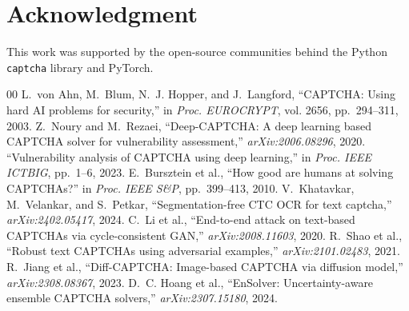 ﻿\documentclass[conference]{IEEEtran}
\begin{document}
\section*{Acknowledgment}
This work was supported by the open-source communities behind the Python \texttt{captcha} library and PyTorch.

\begin{thebibliography}{00}
 L.~von Ahn, M.~Blum, N.~J. Hopper, and J.~Langford, ``CAPTCHA: Using hard AI problems for security,'' in \textit{Proc. EUROCRYPT}, vol. 2656, pp.~294--311, 2003.
 Z.~Noury and M.~Rezaei, ``Deep-CAPTCHA: A deep learning based CAPTCHA solver for vulnerability assessment,'' \textit{arXiv:2006.08296}, 2020.
 ``Vulnerability analysis of CAPTCHA using deep learning,'' in \textit{Proc. IEEE ICTBIG}, pp.~1--6, 2023.
 E.~Bursztein et al., ``How good are humans at solving CAPTCHAs?'' in \textit{Proc. IEEE S\&P}, pp.~399--413, 2010.
 V.~Khatavkar, M.~Velankar, and S.~Petkar, ``Segmentation-free CTC OCR for text captcha,'' \textit{arXiv:2402.05417}, 2024.
 C.~Li et al., ``End-to-end attack on text-based CAPTCHAs via cycle-consistent GAN,'' \textit{arXiv:2008.11603}, 2020.
 R.~Shao et al., ``Robust text CAPTCHAs using adversarial examples,'' \textit{arXiv:2101.02483}, 2021.
 R.~Jiang et al., ``Diff-CAPTCHA: Image-based CAPTCHA via diffusion model,'' \textit{arXiv:2308.08367}, 2023.
 D.~C. Hoang et al., ``EnSolver: Uncertainty-aware ensemble CAPTCHA solvers,'' \textit{arXiv:2307.15180}, 2024.
\end{thebibliography}
\end{document}
